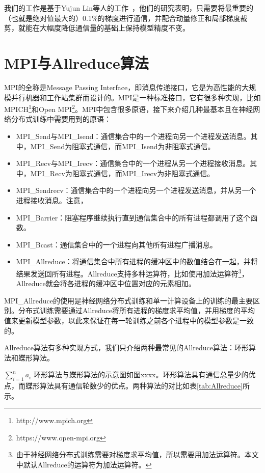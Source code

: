 我们的工作是基于Yujun Lin等人的工作~\cite{lin2017deep}，他们的研究表明，只需要将最重要的（也就是绝对值最大的）0.1\%的梯度进行通信，并配合动量修正和局部梯度裁剪，就能在大幅度降低通信量的基础上保持模型精度不变。

\section{MPI与Allreduce算法}
MPI的全称是Message Passing Interface，即消息传递接口，它是为高性能的大规模并行机器和工作站集群而设计的。MPI是一种标准接口，它有很多种实现，比如MPICH\footnote{http://www.mpich.org}和Open MPI\footnote{https://www.open-mpi.org}。MPI中包含很多原语，接下来介绍几种最基本且在神经网络分布式训练中需要用到的原语：
\begin{itemize}
    \item MPI\_Send与MPI\_Isend：通信集合中的一个进程向另一个进程发送消息。其中，MPI\_Send为阻塞式通信，而MPI\_Isend为非阻塞式通信。
    \item MPI\_Recv与MPI\_Irecv：通信集合中的一个进程从另一个进程接收消息。其中，MPI\_Recv为阻塞式通信，而MPI\_Irecv为非阻塞式通信。
    \item MPI\_Sendrecv：通信集合中的一个进程向另一个进程发送消息，并从另一个进程接收消息。注意，
    \item MPI\_Barrier：阻塞程序继续执行直到通信集合中的所有进程都调用了这个函数。
    \item MPI\_Bcast：通信集合中的一个进程向其他所有进程广播消息。
    \item MPI\_Allreduce：将通信集合中所有进程的缓冲区中的数值结合在一起，并将结果发送回所有进程。Allreduce支持多种运算符，比如使用加法运算符\footnote{由于神经网络分布式训练需要对梯度求平均值，所以需要用加法运算符。本文中默认Allreduce的运算符为加法运算符。}，Allreduce就会将各进程的缓冲区中位置对应的元素相加。
\end{itemize}

MPI\_Allreduce的使用是神经网络分布式训练和单一计算设备上的训练的最主要区别。分布式训练需要通过Allreduce将所有进程的梯度求平均值，并用梯度的平均值来更新模型参数，以此来保证在每一轮训练之前各个进程中的模型参数是一致的。

Allreduce算法有多种实现方式，我们只介绍两种最常见的Allreduce算法：环形算法和蝶形算法。

$\sum_{i = 1}^n a_i$
环形算法与蝶形算法的示意图如图xxxx。环形算法具有通信总量少的优点，而蝶形算法具有通信轮数少的优点。两种算法的对比如表\ref{tab:Allreduce}所示。

